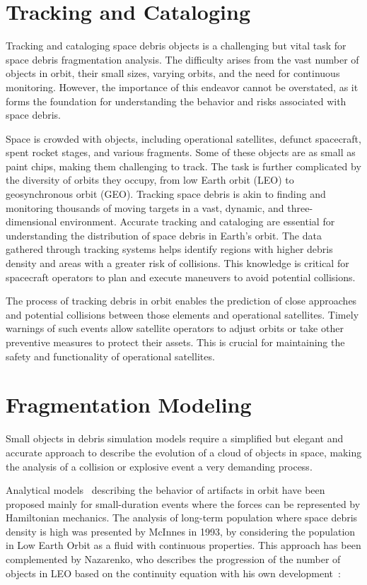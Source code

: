 \documentclass[letterpaper, paper,11pt]{AAS}
\begin{document}
\section{Tracking and Cataloging}
Tracking and cataloging space debris objects is a challenging but vital task for space debris fragmentation analysis. The difficulty arises from the vast number of objects in orbit, their small sizes, varying orbits, and the need for continuous monitoring. However, the importance of this endeavor cannot be overstated, as it forms the foundation for understanding the behavior and risks associated with space debris.

Space is crowded with objects, including operational satellites, defunct spacecraft, spent rocket stages, and various fragments. Some of these objects are as small as paint chips, making them challenging to track. The task is further complicated by the diversity of orbits they occupy, from low Earth orbit (LEO) to geosynchronous orbit (GEO). Tracking space debris is akin to finding and monitoring thousands of moving targets in a vast, dynamic, and three-dimensional environment. Accurate tracking and cataloging are essential for
understanding the distribution of space debris in Earth's orbit. The data gathered through tracking systems helps identify regions with higher debris density and areas with a greater risk of collisions. This knowledge is critical for spacecraft operators to plan and execute maneuvers to avoid potential collisions.~\cite{watson_optical_2019}

The process of tracking debris in orbit enables the prediction of close approaches and potential collisions between those elements and operational satellites. Timely warnings of such events allow satellite operators to adjust orbits or take other preventive measures to protect their assets. This is crucial for maintaining the safety and functionality of operational satellites.~\cite{noauthor_space_nodate}

\section{Fragmentation Modeling}

Small objects in debris simulation models require a simplified but elegant and accurate approach to describe the evolution of a cloud of objects in space, making the analysis of a collision or explosive event a very demanding process. 

Analytical models~\cite{letizia_continuity_2014} describing the behavior of artifacts in orbit have been proposed mainly for small-duration events where the forces can be represented by Hamiltonian mechanics. The analysis of long-term population where space debris density is high was presented by McInnes in 1993, by considering the population in Low Earth Orbit as a fluid with continuous properties. This approach has been complemented by Nazarenko, who describes the progression of the number of objects in LEO based on the continuity equation with his own development~\cite{letizia_multidimensional_2016}:
\end{document}
